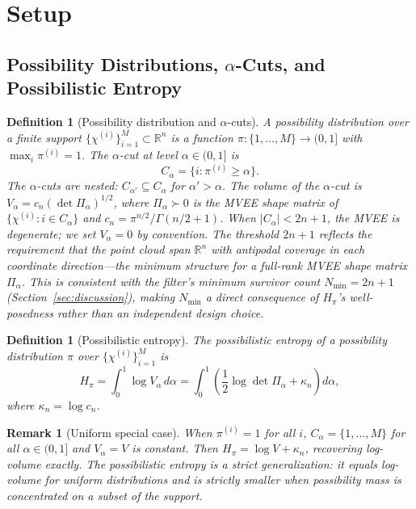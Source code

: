 \documentclass[12pt]{article}
\newtheorem{definition}[theorem]{Definition}
\newtheorem{remark}[theorem]{Remark}
\begin{document}
\section{Setup}
\label{sec:setup}

\subsection{Possibility Distributions, $\alpha$-Cuts, and Possibilistic Entropy}

\begin{definition}[Possibility distribution and $\alpha$-cuts]
A possibility distribution over a finite support
$\{\chi^{(i)}\}^M_{i=1} \subset \mathbb{R}^n$
is a function $\pi : \{1,\ldots,M\} \to (0,1]$ with $\max_i \pi^{(i)} = 1$. The $\alpha$-cut at level $\alpha \in (0,1]$ is
\begin{equation}
C_\alpha = \{i : \pi^{(i)} \geq \alpha\}.
\end{equation}
The $\alpha$-cuts are nested: $C_{\alpha'} \subseteq C_\alpha$ for $\alpha' > \alpha$. The volume of the $\alpha$-cut is $V_\alpha = c_n(\det \Pi_\alpha)^{1/2}$,
where $\Pi_\alpha \succ 0$ is the MVEE shape matrix of $\{\chi^{(i)} : i \in C_\alpha\}$ and $c_n = \pi^{n/2}/\Gamma(n/2+1)$. When
$|C_\alpha| < 2n+1$, the MVEE is degenerate; we set $V_\alpha = 0$ by convention. The threshold $2n+1$
reflects the requirement that the point cloud span $\mathbb{R}^n$ with antipodal coverage in each coordinate
direction---the minimum structure for a full-rank MVEE shape matrix $\Pi_\alpha$. This is consistent with
the filter's minimum survivor count $N_{\min} = 2n+1$ (Section~\ref{sec:discussion}), making $N_{\min}$ a direct consequence
of $H_\pi$'s well-posedness rather than an independent design choice.
\end{definition}

\begin{definition}[Possibilistic entropy]
The possibilistic entropy of a possibility distribution $\pi$ over
$\{\chi^{(i)}\}^M_{i=1}$ is
\begin{equation}
H_\pi = \int_0^1 \log V_\alpha\, d\alpha = \int_0^1 \left(\frac{1}{2}\log \det \Pi_\alpha + \kappa_n\right) d\alpha,
\end{equation}
where $\kappa_n = \log c_n$.
\end{definition}

\begin{remark}[Uniform special case]
When $\pi^{(i)} = 1$ for all $i$, $C_\alpha = \{1,\ldots,M\}$ for all $\alpha \in (0,1]$ and
$V_\alpha = V$ is constant. Then $H_\pi = \log V + \kappa_n$, recovering log-volume exactly. The possibilistic entropy
is a strict generalization: it equals log-volume for uniform distributions and is strictly smaller when
possibility mass is concentrated on a subset of the support.
\end{remark}
\end{document}
